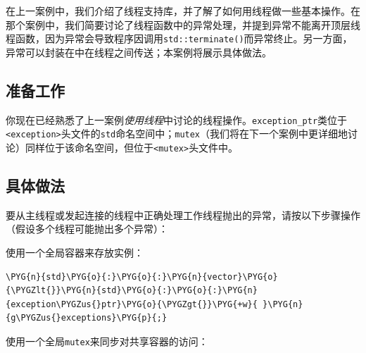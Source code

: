 
在上一案例中，我们介绍了线程支持库，并了解了如何用线程做一些基本操作。在那个案例中，我们简要讨论了线程函数中的异常处理，并提到异常不能离开顶层线程函数，因为异常会导致程序因调用\texttt{std::\allowbreak{}terminate()}而异常终止。另一方面，异常可以封装在中在线程之间传送；本案例将展示具体做法。



\subsection{准备工作}



你现在已经熟悉了上一案例\textit{使用线程}中讨论的线程操作。\texttt{exception\_\allowbreak{}ptr}类位于\texttt{<\allowbreak{}exception>}头文件的\texttt{std}命名空间中；\texttt{mutex}（我们将在下一个案例中更详细地讨论）同样位于该命名空间，但位于\texttt{<\allowbreak{}mutex>}头文件中。



\subsection{具体做法}



要从主线程或发起连接的线程中正确处理工作线程抛出的异常，请按以下步骤操作（假设多个线程可能抛出多个异常）：



使用一个全局容器来存放实例：



\begin{codeblockbg}
\begin{Verbatim}[commandchars=\\\{\},breaklines=true,breakanywhere=true,fontsize=\codefont,xleftmargin=17bp]
\PYG{n}{std}\PYG{o}{:}\PYG{o}{:}\PYG{n}{vector}\PYG{o}{\PYGZlt{}}\PYG{n}{std}\PYG{o}{:}\PYG{o}{:}\PYG{n}{exception\PYGZus{}ptr}\PYG{o}{\PYGZgt{}}\PYG{+w}{ }\PYG{n}{g\PYGZus{}exceptions}\PYG{p}{;}
\end{Verbatim}
\end{codeblockbg}



使用一个全局\texttt{mutex}来同步对共享容器的访问：



